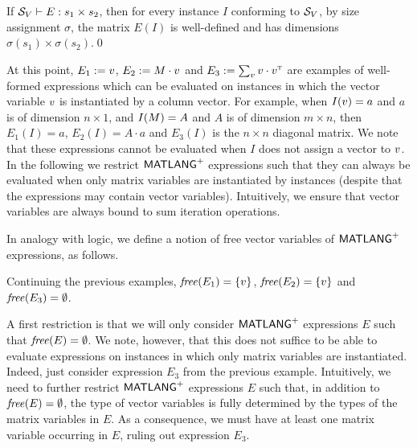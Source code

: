 \begin{proposition}[Safety]
If $\mathcal{S}_V \vdash E : s_1 \times s_2$, then for every instance $I$
conforming to $\mathcal{S}_V$, by size assignment $\sigma$, the
matrix $E(I)$ is well-defined and has dimensions
$\sigma(s_1) \times \sigma(s_2)$.\qed
\end{proposition}

\begin{example}
At this point, $E_1:=v$,  $E_2:=M\cdot v$ and $E_3:=\sum_{v} v\cdot v^{\textsc{t}}$ are examples of well-formed expressions
which can be evaluated on instances in which the vector variable $v$ is instantiated by a column vector. For example,
when $I(v)=a$ and $a$ is of dimension $n\times 1$, and $I(M)=A$ and $A$ is of dimension $m\times n$, then
$E_1(I)=a$, $E_2(I)=A\cdot a$ and $E_3(I)$ is the $n\times n$ diagonal matrix. We note that these expressions cannot be evaluated
when $I$ does not assign a vector to $v$. In the following we restrict $\mathsf{MATLANG}^{\sf +}$ expressions such that they can always be evaluated
when only matrix variables are instantiated by instances (despite that the expressions may contain vector variables). Intuitively, we
ensure that vector variables are always bound to sum iteration operations.
\end{example}


In analogy with logic, we define a notion of free vector variables of $\mathsf{MATLANG}^{\sf +}$ expressions, as follows.


\begin{example}
Continuing the previous examples, $\operatorname{\mathit{free}}(E_1)=\{v\}$, $\operatorname{\mathit{free}}(E_2)=\{v\}$ and 
$\operatorname{\mathit{free}}(E_3)=\emptyset$.
\end{example}

A first restriction is that we will only consider $\mathsf{MATLANG}^{\sf +}$ expressions $E$ such that $\operatorname{\mathit{free}}(E)=\emptyset$.
We note, however, that this does not suffice to be able to evaluate expressions on instances in which only
matrix variables are instantiated. Indeed, just consider expression $E_3$ from the previous example.
Intuitively, we need to further restrict $\mathsf{MATLANG}^{\sf +}$ expressions $E$ such that, in addition to $\operatorname{\mathit{free}}(E)=\emptyset$,
the type of vector variables is fully determined by the types of the matrix variables in $E$. 
As a consequence,
we must have at least one matrix variable occurring in $E$, ruling out expression $E_3$. 

